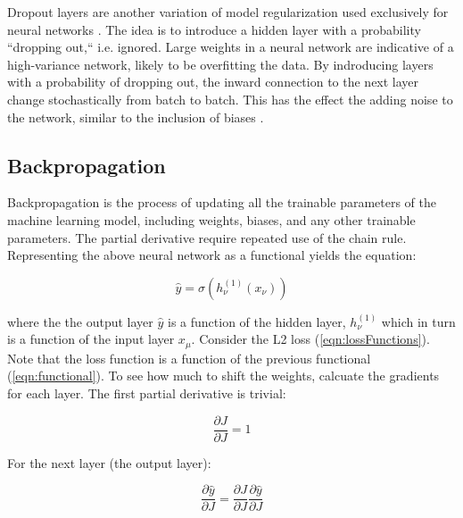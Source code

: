 Dropout layers are another variation of model regularization used exclusively for neural networks \cite{dropout-srivastava2014}. The idea is to introduce a hidden layer with a probability ``dropping out,`` i.e. ignored. Large weights in a neural network are indicative of a high-variance network, likely to be overfitting the data. By indroducing layers with a probability of dropping out, the inward connection to the next layer change stochastically from batch to batch. This has the effect the adding noise to the network, similar to the inclusion of biases \cite{conv-dropout-layers} \cite{conv-dropout-layers2}.

\subsection{Backpropagation}
Backpropagation is the process of updating all the trainable parameters of the machine learning model, including weights, biases, and any other trainable parameters. The partial derivative require repeated use of the chain rule. Representing the above neural network as a functional yields the equation:


\begin{equation}
    \label{eqn:functional}
    \hat{y} = \sigma \left( h_\nu ^{(1)} \left( x_\nu \right) \right)
\end{equation}

\noindent where the the output layer $ \hat{y} $ is a function of the hidden layer, $ h_\nu ^{(1)} $ which in turn is a function of the input layer $ x_\mu $. Consider the L2 loss (\ref{eqn:lossFunctions}). Note that the loss function is a function of the previous functional (\ref{eqn:functional}). To see how much to shift the weights, calcuate the gradients for each layer. The first partial derivative is trivial:

\begin{equation}
    \frac{\partial J}{\partial J} = 1
\end{equation}

\noindent For the next layer (the output layer):

\begin{equation}
\frac{\partial \hat{y}}{\partial J} = \frac{\partial J}{\partial J}\frac{\partial \hat{y}}{\partial J}
\end{equation}


